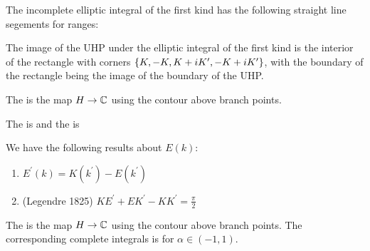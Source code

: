 \documentclass{article}
\begin{document}
\begin{prop}
	The incomplete elliptic integral of the first kind has the following straight line segements for ranges:
\end{prop}

\begin{corollary}
	The image of the UHP under the elliptic integral of the first kind is the interior of the rectangle with corners $\left\{ K,-K,K+iK^\prime, -K+iK^\prime \right\}$, with the boundary of the rectangle being the image of the boundary of the UHP.
\end{corollary}

\begin{definition}
	The  is the map $H\to \mathbb{C}$ 
using the contour above branch points.
\end{definition}

\begin{definition}
	The  is 
	and the  is 
\end{definition}

\begin{prop}
	We have the following results about $E(k)$:
	\begin{enumerate}
		\item $E^\prime(k) = K(k^\prime) - E(k^\prime)$
		\item (Legendre 1825) $KE^\prime + EK^\prime - KK^\prime = \frac{\pi}{2}$
	\end{enumerate}
\end{prop}

\begin{definition}
	The  is the map $H \to \mathbb{C}$ 
using the contour above branch points. The corresponding complete integrals is 
for $\alpha \in (-1,1)$. 
\end{definition}
\end{document}
